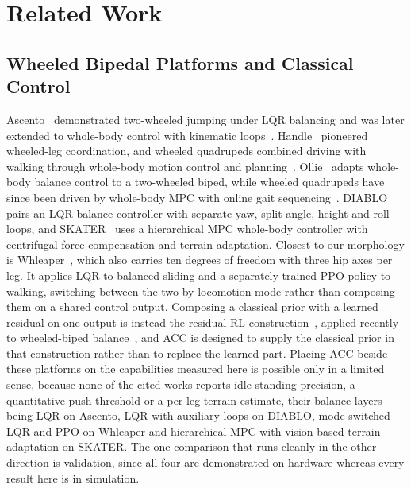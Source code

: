 \documentclass[a4paper,fleqn]{cas-dc}
\begin{document}
\section{Related Work}
\label{sec:related}

\subsection{Wheeled Bipedal Platforms and Classical Control}
\label{sec:related_pos}
Ascento~\cite{klemm2019ascento} demonstrated two-wheeled jumping under LQR
balancing and was later extended to whole-body control with kinematic
loops~\cite{klemm2020lqrwbc}. Handle~\cite{boston_dynamics_handle2017} pioneered
wheeled-leg coordination, and wheeled quadrupeds combined driving with walking
through whole-body motion control and planning~\cite{bjelonic2019wheeled}.
Ollie~\cite{zhang2022ollie} adapts whole-body balance control to a two-wheeled
biped, while wheeled quadrupeds have since been driven by whole-body MPC with
online gait sequencing~\cite{bjelonic2021mpc}. DIABLO~\cite{diablo2024} pairs an
LQR balance controller with separate yaw, split-angle, height and roll loops,
and SKATER~\cite{skater2024} uses a hierarchical MPC whole-body controller with
centrifugal-force compensation and terrain adaptation. Closest to our morphology
is Whleaper~\cite{whleaper2024}, which also carries ten degrees of freedom with
three hip axes per leg. It applies LQR to balanced sliding and a separately
trained PPO policy to walking, switching between the two by locomotion mode
rather than composing them on a shared control output. Composing a classical
prior with a learned residual on one output is instead the residual-RL
construction~\cite{johannink2019residual,silver2018residual}, applied recently
to wheeled-biped balance~\cite{zhang2025residualwbr}, and ACC is designed to
supply the classical prior in that construction rather than to replace the
learned part. Placing ACC beside these platforms on the capabilities measured here is
possible only in a limited sense, because none of the cited works reports idle
standing precision, a quantitative push threshold or a per-leg terrain estimate,
their balance layers being LQR on Ascento, LQR with auxiliary loops on DIABLO,
mode-switched LQR and PPO on Whleaper and hierarchical MPC with vision-based
terrain adaptation on SKATER. The one comparison that runs cleanly in the other
direction is validation, since all four are demonstrated on hardware whereas
every result here is in simulation.
\end{document}
